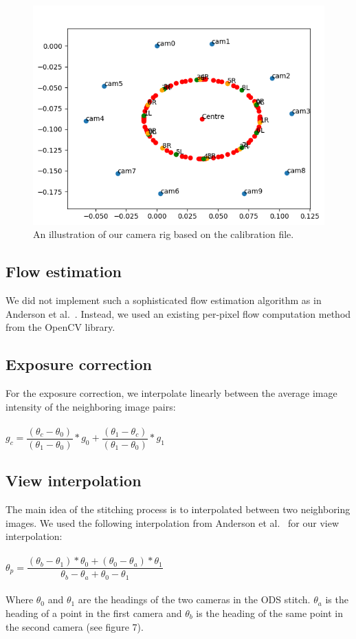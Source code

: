 \documentclass[10pt,twocolumn,letterpaper]{article}
\begin{document}
\begin{figure}[t]
\begin{center}
   \includegraphics[width=0.8\linewidth]{pictures/our_camera_rig.png}
\end{center}
   \caption{An illustration of our camera rig based on the calibration file.}
\label{fig:long}
\label{fig:onecol}
\end{figure}

\subsection{Flow estimation}
We did not implement such a sophisticated flow estimation algorithm as in Anderson et al.~\cite{jump16}. Instead, we used an existing per-pixel flow computation method from the OpenCV library.

\subsection{Exposure correction}
For the exposure correction, we interpolate linearly between the average image intensity of the neighboring image pairs:\\
\\
$g_{c}=\dfrac{(\theta_{c}-\theta_{0})}{(\theta_1-\theta_{0})}*g_{0} + \dfrac{(\theta_{1}-\theta_{c})}{(\theta_1-\theta_{0})}*g_{1}$
\\
\subsection{View interpolation}
The main idea of the stitching process is to interpolated between two neighboring images.
We used the following interpolation from Anderson et al.~\cite{jump16} for our view interpolation:\\
\\
$\theta_p=\dfrac{(\theta_{b}-\theta_{1})*\theta_{0}+(\theta_{0}-\theta_{a})*\theta_{1}}{\theta_{b}-\theta_{a}+\theta_{0}-\theta_{1}}$
\\
\\
Where $\theta_ {0}$ and $\theta_ {1}$ are the headings of the two cameras in the ODS stitch. $\theta_ {a}$ is the heading of a point in the first camera and $\theta_ {b}$ is the heading of the same point in the second camera (see figure 7).
\end{document}
